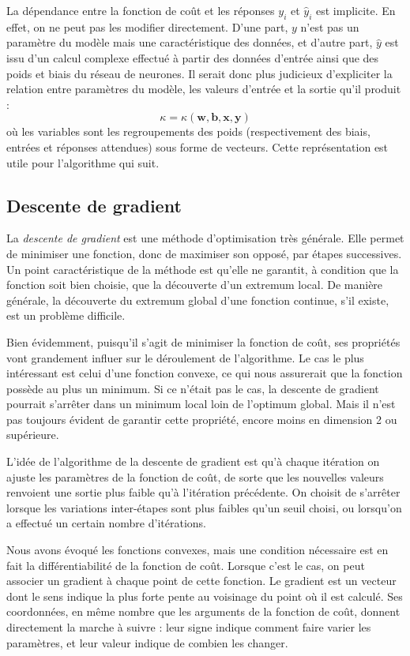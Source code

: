 La dépendance entre la fonction de coût et les réponses \(y_i\) et \(\hat{y}_i\) est implicite. En effet, on ne peut pas les modifier directement. D'une part, $y$ n'est pas un paramètre du modèle mais une caractéristique des données, et d'autre part, $\hat{y}$ est issu d'un calcul complexe effectué à partir des données d'entrée ainsi que des poids et biais du réseau de neurones. Il serait donc plus judicieux d'expliciter la relation entre paramètres du modèle, les valeurs d'entrée et la sortie qu'il produit : 
\[ \kappa = \kappa(\boldsymbol{w}, \boldsymbol{b}, \boldsymbol{x}, \boldsymbol{y})\]
où les variables sont les regroupements des poids (respectivement des biais, entrées et réponses attendues) sous forme de vecteurs.
Cette représentation est utile pour l'algorithme qui suit.

\subsection{Descente de gradient}\label{subseq:desc_grad}
La \emph{descente de gradient} est une méthode d'optimisation très générale. Elle permet de minimiser une fonction, donc de maximiser son opposé, par étapes successives. Un point caractéristique de la méthode est qu'elle ne garantit, à condition que la fonction soit bien choisie, que la découverte d'un extremum local. De manière générale, la découverte du extremum global d'une fonction continue, s'il existe, est un problème difficile.

Bien évidemment, puisqu'il s'agit de minimiser la fonction de coût, ses propriétés vont grandement influer sur le déroulement de l'algorithme. Le cas le plus intéressant est celui d'une fonction convexe, ce qui nous assurerait que la fonction possède au plus un minimum. Si ce n'était pas le cas, la descente de gradient pourrait s'arrêter dans un minimum local loin de l'optimum global. Mais il n'est pas toujours évident de garantir cette propriété, encore moins en dimension 2 ou supérieure.

L'idée de l'algorithme de la descente de gradient est qu'à chaque itération on ajuste les paramètres de la fonction de coût, de sorte que les nouvelles valeurs renvoient une sortie plus faible qu'à l'itération précédente. On choisit de s'arrêter lorsque les variations inter-étapes sont plus faibles qu'un seuil choisi, ou lorsqu'on a effectué un certain nombre d'itérations. 

Nous avons évoqué les fonctions convexes, mais une condition nécessaire est en fait la différentiabilité de la fonction de coût. Lorsque c'est le cas, on peut associer un gradient à chaque point de cette fonction. Le gradient est un vecteur dont le sens indique la plus forte pente au voisinage du point où il est calculé. Ses coordonnées, en même nombre que les arguments de la fonction de coût, donnent directement la marche à suivre : leur signe indique comment faire varier les paramètres, et leur valeur indique de combien les changer.  


